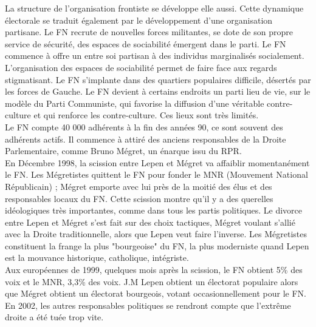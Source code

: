 \documentclass[10pt, a4paper, openany]{book}
\begin{document}
La structure de l'organisation frontiste se développe elle aussi. Cette dynamique électorale se traduit également par le développement d'une organisation partisane. Le FN recrute de nouvelles forces militantes, se dote de son propre service de sécurité, des espaces de sociabilité émergent dans le parti. Le FN commence à offre un entre soi partisan à des individus marginalisés socialement. \\
L'organisation des espaces de sociabilité permet de faire face aux regards stigmatisant. Le FN s'implante dans des quartiers populaires difficile, désertés par les forces de Gauche. Le FN devient à certains endroits un parti lieu de vie, sur le modèle du Parti Communiste, qui favorise la diffusion d'une véritable contre-culture et qui renforce les contre-culture. Ces lieux sont très limités. \\
Le FN compte 40 000 adhérents à la fin des années 90, ce sont souvent des adhérents actifs. Il commence à attiré des anciens responsables de la Droite Parlementaire, comme Bruno Mégret, un énarque issu du RPR. \\
En Décembre 1998, la scission entre Lepen et Mégret va affaiblir momentanément le FN. Les Mégretistes quittent le FN pour fonder le MNR (Mouvement National Républicain) ; Mégret emporte avec lui près de la moitié des élus et des responsables locaux du FN. Cette scission montre qu'il y a des querelles idéologiques très importantes, comme dans tous les partis politiques. Le divorce entre Lepen et Mégret s'est fait sur des choix tactiques, Mégret voulant s'allié avec la Droite traditionnelle, alors que Lepen veut faire l'inverse. Les Mégretistes constituent la frange la plus "bourgeoise" du FN, la plus moderniste quand Lepen est la mouvance historique, catholique, intégriste. \\
Aux européennes de 1999, quelques mois après la scission, le FN obtient 5\% des voix et le MNR, 3,3\% des voix. J.M Lepen obtient un électorat populaire alors que Mégret obtient un électorat bourgeois, votant occasionnellement pour le FN. En 2002, les autres responsables politiques se rendront compte que l'extrême droite a été tuée trop vite. 
\end{document}
